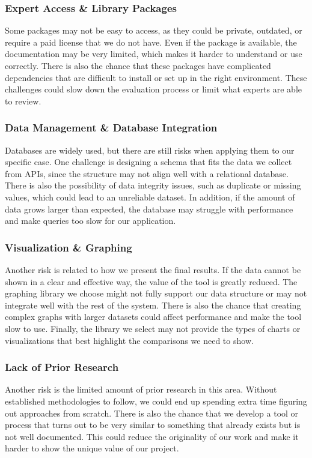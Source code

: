 \documentclass{article}
\begin{document}
\subsubsection*{Expert Access \& Library Packages}\vspace{-0.5em}
Some packages may not be easy to access, as they could be private, outdated, or require a paid license that we do not have. Even if the package is available, the documentation may be very limited, which makes it harder to understand or use correctly. There is also the chance that these packages have complicated dependencies that are difficult to install or set up in the right environment. These challenges could slow down the evaluation process or limit what experts are able to review.

\subsubsection*{Data Management \& Database Integration}\vspace{-0.5em}
Databases are widely used, but there are still risks when applying them to our specific case. One challenge is designing a schema that fits the data we collect from APIs, since the structure may not align well with a relational database. There is also the possibility of data integrity issues, such as duplicate or missing values, which could lead to an unreliable dataset. In addition, if the amount of data grows larger than expected, the database may struggle with performance and make queries too slow for our application.

\subsubsection*{Visualization \& Graphing}\vspace{-0.5em}
Another risk is related to how we present the final results. If the data cannot be shown in a clear and effective way, the value of the tool is greatly reduced. The graphing library we choose might not fully support our data structure or may not integrate well with the rest of the system. There is also the chance that creating complex graphs with larger datasets could affect performance and make the tool slow to use. Finally, the library we select may not provide the types of charts or visualizations that best highlight the comparisons we need to show.

\subsubsection*{Lack of Prior Research}\vspace{-0.5em}
Another risk is the limited amount of prior research in this area. Without established methodologies to follow, we could end up spending extra time figuring out approaches from scratch. There is also the chance that we develop a tool or process that turns out to be very similar to something that already exists but is not well documented. This could reduce the originality of our work and make it harder to show the unique value of our project.
\end{document}
